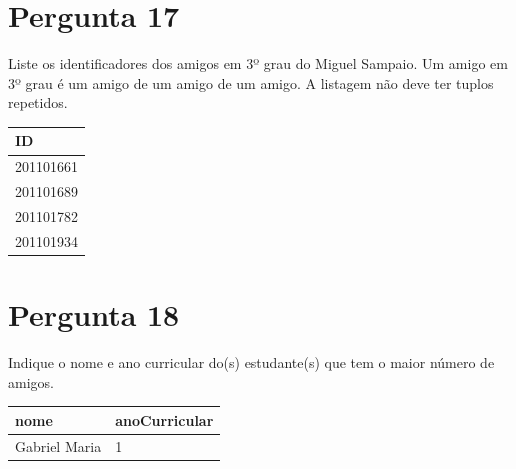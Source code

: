 \section{Pergunta 17}
Liste os identificadores dos amigos em 3º grau do Miguel Sampaio. Um amigo em 3º grau é um amigo de um amigo de um amigo. A listagem não deve ter tuplos repetidos.
\begin{center} \begin{tabular}{l}
    \textbf{ID} \\ \hline
    201101661   \\
    201101689   \\
    201101782   \\
    201101934 
\end{tabular} \end{center}


\section{Pergunta 18}
Indique o nome e ano curricular do(s) estudante(s) que tem o maior número de amigos.
\begin{center} \begin{tabular}{l | l}
    \textbf{nome} & \textbf{anoCurricular} \\ \hline
    Gabriel Maria & 1
\end{tabular} \end{center}

